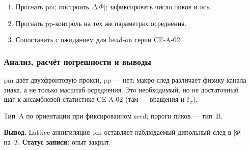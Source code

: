 \begin{enumerate}[label=\textbf{Шаг \arabic*:},leftmargin=*,itemsep=0.35em]
\item Прогнать pm; построить $\Delta|\Phi|$; зафиксировать число пиков и ось.
\item Прогнать pp-контроль на тех же параметрах осреднения.
\item Сопоставить с ожиданием для head-on серии CE-A-02.
\end{enumerate}

\subsubsection*{Анализ, расчёт погрешности и выводы}
pm даёт двухфронтовую прокси, pp --- нет: макро-след различает физику канала знака, а не только масштаб осреднения.
Это необходимый, но не достаточный шаг к ансамблевой статистике CE-A-02 (там --- вращения и $\bar\varepsilon_\pi$).

Тип~A по ориентации при фиксированном seed; пороги пиков --- тип~B.

\textbf{Вывод.}
Lattice-аннигиляция pm оставляет наблюдаемый дипольный след в $|\Phi|$ на~$T$.
\textbf{Статус записи:} опыт закрыт.
